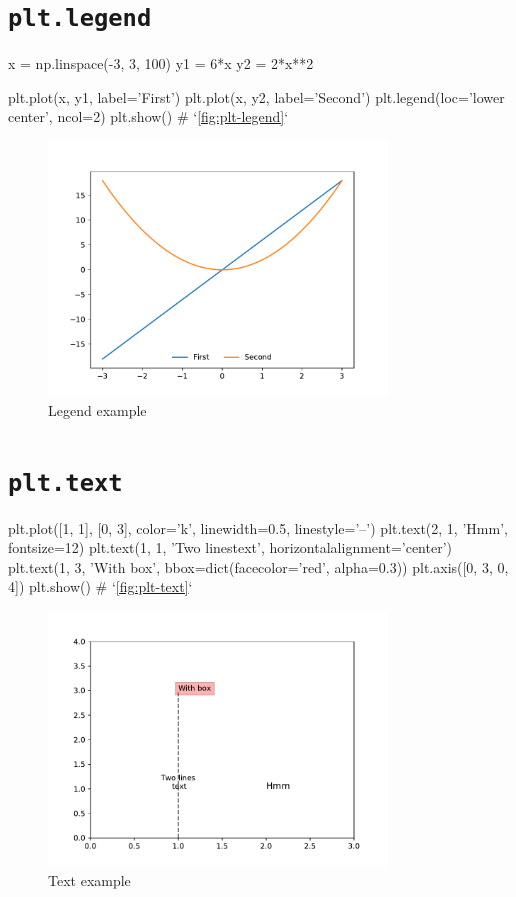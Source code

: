 \documentclass{report}
\begin{document}
\section{\texttt{plt.legend}}
\begin{py}
x = np.linspace(-3, 3, 100)
y1 = 6*x
y2 = 2*x**2

plt.plot(x, y1, label='First')
plt.plot(x, y2, label='Second')
plt.legend(loc='lower center', ncol=2)
plt.show() # `\autoref{fig:plt-legend}`
\end{py}

\begin{figure}[!htb]
  \centering
  \includegraphics[width=90mm]{plt-legend}
  \caption{Legend example}
  \label{fig:plt-legend}
\end{figure}

\section{\texttt{plt.text}}
\begin{py}
plt.plot([1, 1], [0, 3], color='k', linewidth=0.5, linestyle='--')
plt.text(2, 1, 'Hmm', fontsize=12)
plt.text(1, 1, 'Two lines\n text', horizontalalignment='center')
plt.text(1, 3, 'With box', bbox=dict(facecolor='red', alpha=0.3))
plt.axis([0, 3, 0, 4])
plt.show()  # `\autoref{fig:plt-text}`
\end{py}

\begin{figure}[!htb]
  \centering
  \includegraphics[width=90mm]{plt-text}
  \caption{Text example}
  \label{fig:plt-text}
\end{figure}
\end{document}
